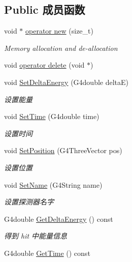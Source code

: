 \subsection*{Public 成员函数}
\begin{DoxyCompactItemize}
\item 
void $\ast$ \hyperlink{classEnergyTimeHit_a13352f0fdc7bf25e3655b803b50ae9ca}{operator new} (size\+\_\+t)
\begin{DoxyCompactList}\small\item\em Memory allocation and de-\/allocation \end{DoxyCompactList}\item 
void \hyperlink{classEnergyTimeHit_ab146f5c1aec4e913a416faee3b2ff60b}{operator delete} (void $\ast$)
\item 
void \hyperlink{classEnergyTimeHit_ab7a9602285c51cf42566382df8277147}{Set\+Delta\+Energy} (G4double deltaE)
\begin{DoxyCompactList}\small\item\em 设置能量 \end{DoxyCompactList}\item 
void \hyperlink{classEnergyTimeHit_a139ed317e433a0ddef477117f39daf8a}{Set\+Time} (G4double time)
\begin{DoxyCompactList}\small\item\em 设置时间 \end{DoxyCompactList}\item 
void \hyperlink{classEnergyTimeHit_a987123b85e019adc1f01332bb23c3f2c}{Set\+Position} (G4\+Three\+Vector pos)
\begin{DoxyCompactList}\small\item\em 设置位置 \end{DoxyCompactList}\item 
void \hyperlink{classEnergyTimeHit_aadf608ec3e5d06c9735546b29a0f92b4}{Set\+Name} (G4\+String name)
\begin{DoxyCompactList}\small\item\em 设置探测器名字 \end{DoxyCompactList}\item 
G4double \hyperlink{classEnergyTimeHit_a15aae5ff8efc3a4efc39c00c26308836}{Get\+Delta\+Energy} () const
\begin{DoxyCompactList}\small\item\em 得到 hit 中能量信息 \end{DoxyCompactList}\item 
G4double \hyperlink{classEnergyTimeHit_ab7f49eaf401c5b559876d69330c57c78}{Get\+Time} () const

\end{DoxyCompactItemize}
